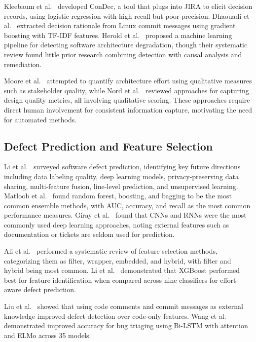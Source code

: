 \documentclass[preprint,12pt]{elsarticle}
\begin{document}
Kleebaum et al.~\cite{kleebaum2021} developed ConDec, a tool that plugs into JIRA to elicit decision records, using logistic regression with high recall but poor precision. Dhaouadi et al.~\cite{dhaouadi2023} extracted decision rationale from Linux commit messages using gradient boosting with TF-IDF features. Herold et al.~\cite{herold2020} proposed a machine learning pipeline for detecting software architecture degradation, though their systematic review found little prior research combining detection with causal analysis and remediation.

Moore et al.~\cite{moore2003} attempted to quantify architecture effort using qualitative measures such as stakeholder quality, while Nord et al.~\cite{nord2014} reviewed approaches for capturing design quality metrics, all involving qualitative scoring. These approaches require direct human involvement for consistent information capture, motivating the need for automated methods.

\subsection{Defect Prediction and Feature Selection}

Li et al.~\cite{li2024} surveyed software defect prediction, identifying key future directions including data labeling quality, deep learning models, privacy-preserving data sharing, multi-feature fusion, line-level prediction, and unsupervised learning. Matloob et al.~\cite{matloob2021} found random forest, boosting, and bagging to be the most common ensemble methods, with AUC, accuracy, and recall as the most common performance measures. Giray et al.~\cite{giray2023} found that CNNs and RNNs were the most commonly used deep learning approaches, noting external features such as documentation or tickets are seldom used for prediction.

Ali et al.~\cite{ali2023} performed a systematic review of feature selection methods, categorizing them as filter, wrapper, embedded, and hybrid, with filter and hybrid being most common. Li et al.~\cite{li2023} demonstrated that XGBoost performed best for feature identification when compared across nine classifiers for effort-aware defect prediction.

Liu et al.~\cite{liu2023} showed that using code comments and commit messages as external knowledge improved defect detection over code-only features. Wang et al.~\cite{wang2024} demonstrated improved accuracy for bug triaging using Bi-LSTM with attention and ELMo across 35 models.
\end{document}
